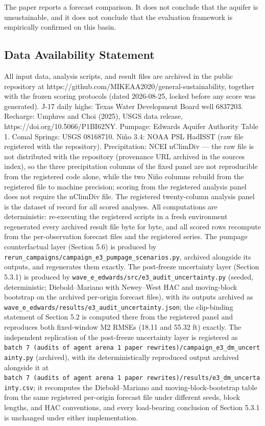 \documentclass[11pt]{article}
\begin{document}
The paper reports a forecast comparison. It does not conclude that the
aquifer is unsustainable, and it does not conclude that the evaluation
framework is empirically confirmed on this basin.

\subsection{Data Availability
Statement}\label{data-availability-statement}

All input data, analysis scripts, and result files are archived in the
public repository at
https://github.com/MIKEAA2020/general-sustainability, together with the
frozen scoring protocols (dated 2026-08-25, locked before any score was
generated). J-17 daily highs: Texas Water Development Board well
6837203. Recharge: Umphres and Choi (2025), USGS data release,
https://doi.org/10.5066/P1BI62NY. Pumpage: Edwards Aquifer Authority
Table 1. Comal Springs: USGS 08168710. Ni\~no 3.4: NOAA PSL HadISST (raw
file registered with the repository). Precipitation: NCEI nClimDiv ---
the raw file is not distributed with the repository (provenance URL
archived in the sources index), so the three precipitation columns of
the fixed panel are not reproducible from the registered code alone,
while the two Ni\~no columns rebuild from the registered file to machine
precision; scoring from the registered analysis panel does not require
the nClimDiv file. The registered twenty-column analysis panel is the
dataset of record for all scored analyses. All computations are
deterministic: re-executing the registered scripts in a fresh
environment regenerated every archived result file byte for byte, and
all scored rows recompute from the per-observation forecast files and
the registered series. The pumpage counterfactual layer (Section 5.6) is
produced by
\texttt{rerun\_campaigns/campaign\_e3\_pumpage\_scenarios.py}, archived
alongside its outputs, and regenerates them exactly. The post-freeze
uncertainty layer (Section 5.3.1) is produced by
\texttt{wave\_e\_edwards/src/e3\_audit\_uncertainty.py} (seeded,
deterministic; Diebold--Mariano with Newey--West HAC and moving-block
bootstrap on the archived per-origin forecast files), with its outputs
archived as
\texttt{wave\_e\_edwards/results/e3\_audit\_uncertainty.json}; the
clip-binding statement of Section 5.2 is computed there from the
registered panel and reproduces both fixed-window M2 RMSEs (18.11 and
55.32 ft) exactly. The independent replication of the post-freeze
uncertainty layer is registered as
\texttt{batch\ 7\ (audits\ of\ agent\ arena\ 1\ paper\ rewrites)/campaign\_e3\_dm\_uncertainty.py}
(archived), with its deterministically reproduced output archived
alongside it at
\texttt{batch\ 7\ (audits\ of\ agent\ arena\ 1\ paper\ rewrites)/results/e3\_dm\_uncertainty.csv};
it recomputes the Diebold--Mariano and moving-block-bootstrap table from
the same registered per-origin forecast file under different seeds,
block lengths, and HAC conventions, and every load-bearing conclusion of
Section 5.3.1 is unchanged under either implementation.
\end{document}
